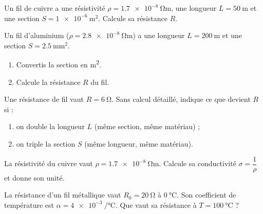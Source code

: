 \documentclass[11pt,a4paper]{article}
\begin{document}
\usetikzlibrary{babel}
\begin{exo}
Un fil de cuivre a une résistivité $\rho=\qty{1.7e-8}{\ohm\metre}$, une longueur $L=\qty{50}{\metre}$
et une section $S=\qty{1e-6}{\metre\squared}$. Calcule sa résistance $R$.
\end{exo}

\begin{exo}
Un fil d'aluminium ($\rho=\qty{2.8e-8}{\ohm\metre}$) a une longueur $L=\qty{200}{\metre}$ et une
section $S=\qty{2.5}{\milli\metre\squared}$.
\begin{enumerate}[label=\alph*)]
  \item Convertis la section en \si{\metre\squared}.
  \item Calcule la résistance $R$ du fil.
\end{enumerate}
\end{exo}

\begin{exo}[proportionnalités]
Une résistance de fil vaut $R=\qty{6}{\ohm}$. Sans calcul détaillé, indique ce que devient $R$ si :
\begin{enumerate}[label=\alph*)]
  \item on double la longueur $L$ (même section, même matériau) ;
  \item on triple la section $S$ (même longueur, même matériau).
\end{enumerate}
\end{exo}

\begin{exo}[conductivité]
La résistivité du cuivre vaut $\rho=\qty{1.7e-8}{\ohm\metre}$. Calcule sa conductivité
$\sigma=\dfrac{1}{\rho}$ et donne son unité.
\end{exo}

\begin{exo}
La résistance d'un fil métallique vaut $R_0=\qty{20}{\ohm}$ à $\qty{0}{\degreeCelsius}$. Son
coefficient de température est $\alpha=\qty{4e-3}{\per\degreeCelsius}$. Que vaut sa résistance à
$T=\qty{100}{\degreeCelsius}$ ?
\end{exo}
\end{document}

